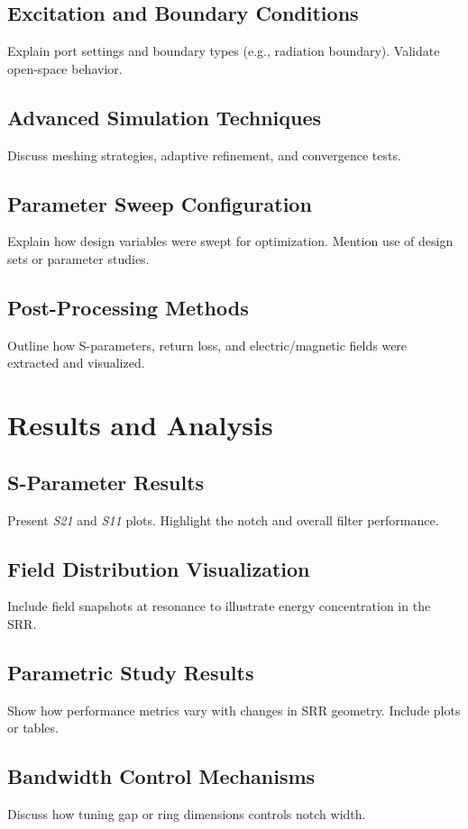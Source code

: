 \documentclass[conference]{IEEEtran}
\begin{document}
\subsection{Excitation and Boundary Conditions}
Explain port settings and boundary types (e.g., radiation boundary). Validate open-space behavior.

\subsection{Advanced Simulation Techniques}
Discuss meshing strategies, adaptive refinement, and convergence tests.

\subsection{Parameter Sweep Configuration}
Explain how design variables were swept for optimization. Mention use of design sets or parameter studies.

\subsection{Post-Processing Methods}
Outline how S-parameters, return loss, and electric/magnetic fields were extracted and visualized.

\section{Results and Analysis}

\subsection{S-Parameter Results}
Present \textit{S21} and \textit{S11} plots. Highlight the notch and overall filter performance.

\subsection{Field Distribution Visualization}
Include field snapshots at resonance to illustrate energy concentration in the SRR.

\subsection{Parametric Study Results}
Show how performance metrics vary with changes in SRR geometry. Include plots or tables.

\subsection{Bandwidth Control Mechanisms}
Discuss how tuning gap or ring dimensions controls notch width.
\end{document}
